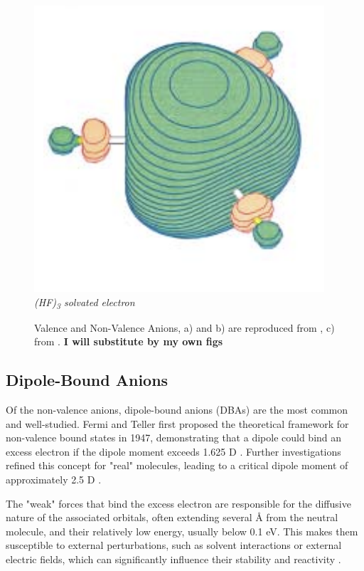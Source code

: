 \begin{figure}[h]
\begin{minipage}[b]{0.27\textwidth}
    \includegraphics[width=\textwidth]{chapters/introduction/image/hf3.png}
    \small\emph{(HF)\textsubscript{3} solvated electron}
  \end{minipage}
  \caption[Valence and Non-Valence Anions]{Valence and Non-Valence Anions, a) and b) are reproduced from \cite{dutta2015electron}, c) from \cite{jordan2003theory}. \textbf{I will substitute by my own figs}}
  \label{fig:AnionTypes}
\end{figure}

\subsection{Dipole-Bound Anions}
Of the non-valence anions, dipole-bound anions (DBAs) are the most common and well-studied. Fermi and Teller first proposed the theoretical framework for non-valence bound states in 1947, demonstrating that a dipole could bind an excess electron if the dipole moment exceeds 1.625 D \cite{fermi1947capture}. Further investigations refined this concept for "real" molecules, leading to a critical dipole moment of approximately 2.5 D \cite{jordan2003theory}.

The "weak" forces that bind the excess electron are responsible for the diffusive nature of the associated orbitals, often extending several Å from the neutral molecule, and their relatively low energy, usually below 0.1 eV. This makes them susceptible to external perturbations, such as solvent interactions or external electric fields, which can significantly influence their stability and reactivity \cite{simons2008molecular,herbert2015quantum,jordan2003theory}.

